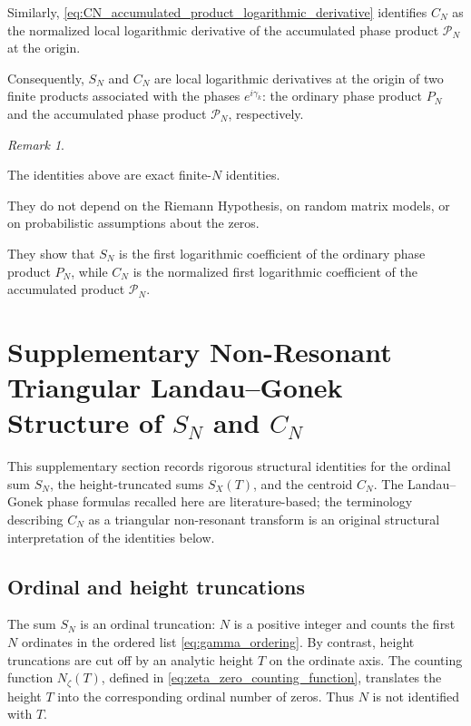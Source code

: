 \documentclass[11pt]{amsart}
\numberwithin{equation}{section}
\theoremstyle{plain}
\theoremstyle{definition}
\theoremstyle{remark}
\newtheorem{remark}[theorem]{Remark}
\begin{document}
Similarly, \eqref{eq:CN_accumulated_product_logarithmic_derivative}
identifies \(C_N\) as the normalized local logarithmic derivative of
the accumulated phase product \(\mathcal{P}_N\) at the origin.

Consequently, \(S_N\) and \(C_N\) are local logarithmic derivatives at
the origin of two finite products associated with the phases
\(e^{i\gamma_k}\): the ordinary phase product \(P_N\) and the accumulated
phase product \(\mathcal{P}_N\), respectively.

\begin{remark}
\label{rem:product_form_summary}

The identities above are exact finite-\(N\) identities.

They do not depend on the Riemann Hypothesis, on random matrix models,
or on probabilistic assumptions about the zeros.

They show that \(S_N\) is the first logarithmic coefficient of the
ordinary phase product \(P_N\), while \(C_N\) is the normalized first
logarithmic coefficient of the accumulated product
\(\mathcal{P}_N\).

\end{remark}


\section[Supplementary Non-Resonant Triangular Landau--Gonek Structure of SN and CN]{Supplementary Non-Resonant Triangular Landau--Gonek Structure of \texorpdfstring{\(S_N\)}{SN} and \texorpdfstring{\(C_N\)}{CN}}
\label{sec:non_resonant_triangular_lg_structure}

This supplementary section records rigorous structural identities for
the ordinal sum \(S_N\), the height-truncated sums \(S_X(T)\), and the
centroid \(C_N\). The Landau--Gonek phase formulas recalled here are literature-based; the
terminology describing \(C_N\) as a triangular non-resonant transform is
an original structural interpretation of the identities below.

\subsection{Ordinal and height truncations}
\label{subsec:ordinal_and_height_truncations}

The sum \(S_N\) is an ordinal truncation: \(N\) is a positive integer
and counts the first \(N\) ordinates in the ordered list
\eqref{eq:gamma_ordering}. By contrast, height truncations are cut off by
an analytic height \(T\) on the ordinate axis. The counting function
\(N_\zeta(T)\), defined in \eqref{eq:zeta_zero_counting_function},
translates the height \(T\) into the corresponding ordinal number of
zeros. Thus \(N\) is not identified with \(T\).
\end{document}
